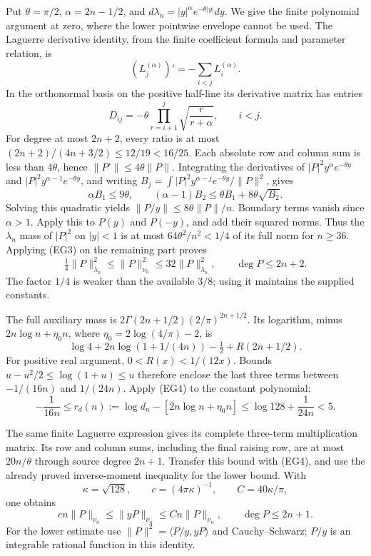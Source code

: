 \documentclass[10pt]{article}
\begin{document}
Put \(\theta=\pi/2\), \(\alpha=2n-1/2\), and \(d\lambda_n=|y|^\alpha e^{-\theta|y|}dy\). We give the finite polynomial argument at zero, where the lower pointwise envelope cannot be used. The Laguerre derivative identity, from the finite coefficient formula and parameter relation, is \[
 (L_j^{(\alpha)})'=-\sum_{i<j}L_i^{(\alpha)}.
\] In the orthonormal basis on the positive half-line its derivative matrix has entries \[
 D_{ij}=-\theta\prod_{r=i+1}^j\sqrt{\frac r{r+\alpha}},\qquad i<j.
\] For degree at most \(2n+2\), every ratio is at most \((2n+2)/(4n+3/2)\le12/19<16/25\). Each absolute row and column sum is less than \(4\theta\), hence \(\|P'\|\le4\theta\|P\|\). Integrating the derivatives of \(|P|^2y^\alpha e^{-\theta y}\) and \(|P|^2y^{\alpha-1}e^{-\theta y}\), and writing \(B_j=\int|P|^2y^{\alpha-j}e^{-\theta y}/\|P\|^2\), gives \[
 \alpha B_1\le9\theta,\qquad
 (\alpha-1)B_2\le\theta B_1+8\theta\sqrt{B_2}.
\] Solving this quadratic yields \(\|P/y\|\le8\theta\|P\|/n\). Boundary terms vanish since \(\alpha>1\). Apply this to \(P(y)\) and \(P(-y)\), and add their squared norms. Thus the \(\lambda_n\) mass of \(|P|^2\) on \(|y|<1\) is at most \(64\theta^2/n^2<1/4\) of its full norm for \(n\ge36\). Applying (EG3) on the remaining part proves \[
 \tfrac14\|P\|_{\lambda_n}^2\le\|P\|_{\nu_n}^2
 \le32\|P\|_{\lambda_n}^2,\qquad \deg P\le2n+2.
 \tag{EG4}
\] The factor \(1/4\) is weaker than the available \(3/8\); using it maintains the supplied constants.

The full auxiliary mass is \(2\Gamma(2n+1/2)(2/\pi)^{2n+1/2}\). Its logarithm, minus \(2n\log n+\eta_0n\), where \(\eta_0=2\log(4/\pi)-2\), is \[
 \log4+2n\log(1+1/(4n))-\tfrac12+R(2n+1/2).
\] For positive real argument, \(0<R(x)<1/(12x)\). Bounds \(u-u^2/2\le\log(1+u)\le u\) therefore enclose the last three terms between \(-1/(16n)\) and \(1/(24n)\). Apply (EG4) to the constant polynomial: \[
 -\frac1{16n}\le r_d(n):=\log d_n-[2n\log n+\eta_0n]
 \le\log128+\frac1{24n}<5.
 \tag{EG5}
\]

The same finite Laguerre expression gives its complete three-term multiplication matrix. Its row and column sums, including the final raising row, are at most \(20n/\theta\) through source degree \(2n+1\). Transfer this bound with (EG4), and use the already proved inverse-moment inequality for the lower bound. With \[
 \kappa=\sqrt{128},\qquad c=(4\pi\kappa)^{-1},\qquad C=40\kappa/\pi,
\] one obtains \[
 cn\|P\|_{\nu_n}\le\|yP\|_{\nu_n}\le Cn\|P\|_{\nu_n},
 \qquad \deg P\le2n+1.
 \tag{EG6}
\] For the lower estimate use \(\|P\|^2=\langle P/y,yP\rangle\) and Cauchy--Schwarz; \(P/y\) is an integrable rational function in this identity.
\end{document}
